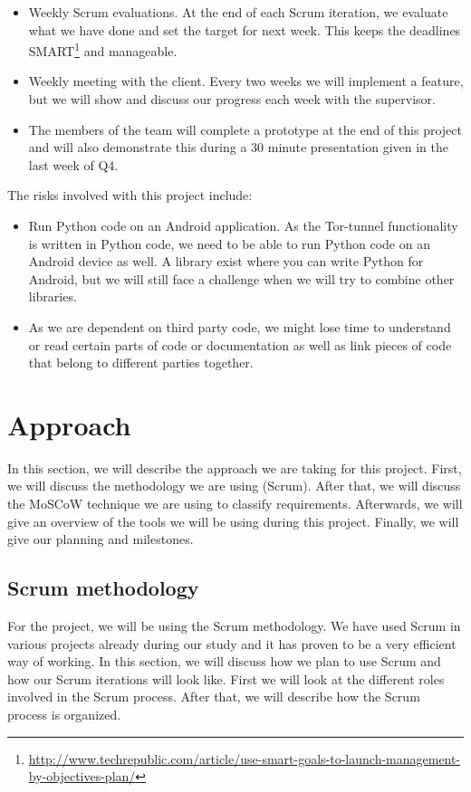 \begin{itemize}
\item Weekly Scrum evaluations. At the end of each Scrum iteration, we evaluate what we have done and set the target for next week. This keeps the deadlines SMART\footnote{\url{http://www.techrepublic.com/article/use-smart-goals-to-launch-management-by-objectives-plan/}} and manageable.
\item Weekly meeting with the client. Every two weeks we will implement a feature, but we will show and discuss our progress each week with the supervisor.
\item The members of the team will complete a prototype at the end of this project and will also demonstrate this during a 30 minute presentation given in the last week of Q4.
\end{itemize}

The risks involved with this project include:
\begin{itemize}
\item Run Python code on an Android application. As the Tor-tunnel functionality is written in Python code, we need to be able to run Python code on an Android device as well. A library exist where you can write Python for Android, but we will still face a challenge when we will try to combine other libraries.
\item As we are dependent on third party code, we might lose time to understand or read certain parts of code or documentation as well as link pieces of code that belong to different parties together.
\end{itemize}



\section{Approach}
In this section, we will describe the approach we are taking for this project. First, we will discuss the methodology we are using (Scrum). After that, we will discuss the MoSCoW technique we are using to classify requirements. Afterwards, we will give an overview of the tools we will be using during this project. Finally, we will give our planning and milestones.

\subsection{Scrum methodology}
For the project, we will be using the Scrum methodology. We have used Scrum in various projects already during our study and it has proven to be a very efficient way of working. In this section, we will discuss how we plan to use Scrum and how our Scrum iterations will look like. First we will look at the different roles involved in the Scrum process. After that, we will describe how the Scrum process is organized.

